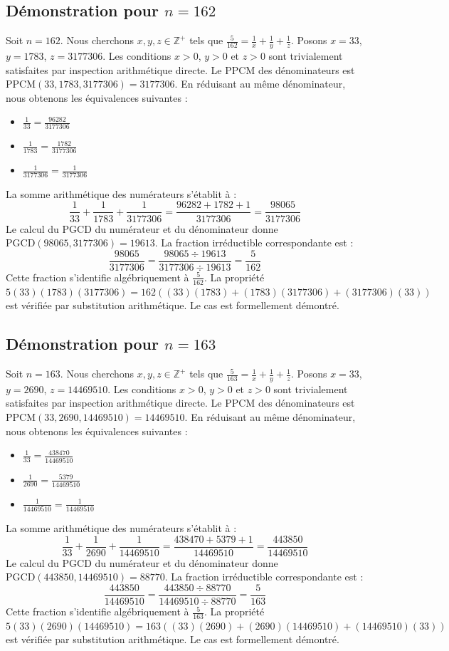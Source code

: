 \documentclass[12pt,a4paper]{article}
\begin{document}
\subsection{Démonstration pour $n = 162$}
Soit $n = 162$. Nous cherchons $x, y, z \in \mathbb{Z}^{+}$ tels que $\frac{5}{162} = \frac{1}{x} + \frac{1}{y} + \frac{1}{z}$.
Posons $x = 33$, $y = 1783$, $z = 3177306$.
Les conditions $x > 0$, $y > 0$ et $z > 0$ sont trivialement satisfaites par inspection arithmétique directe.
Le PPCM des dénominateurs est $\text{PPCM}(33, 1783, 3177306) = 3177306$.
En réduisant au même dénominateur, nous obtenons les équivalences suivantes :
\begin{itemize}
    \item $\frac{1}{33} = \frac{96282}{3177306}$
    \item $\frac{1}{1783} = \frac{1782}{3177306}$
    \item $\frac{1}{3177306} = \frac{1}{3177306}$
\end{itemize}
La somme arithmétique des numérateurs s'établit à :
$$ \frac{1}{33} + \frac{1}{1783} + \frac{1}{3177306} = \frac{96282 + 1782 + 1}{3177306} = \frac{98065}{3177306} $$
Le calcul du PGCD du numérateur et du dénominateur donne $\text{PGCD}(98065, 3177306) = 19613$.
La fraction irréductible correspondante est :
$$ \frac{98065}{3177306} = \frac{98065 \div 19613}{3177306 \div 19613} = \frac{5}{162} $$
Cette fraction s'identifie algébriquement à $\frac{5}{162}$.
La propriété $5(33)(1783)(3177306) = 162((33)(1783) + (1783)(3177306) + (3177306)(33))$ est vérifiée par substitution arithmétique.
Le cas est formellement démontré.

\subsection{Démonstration pour $n = 163$}
Soit $n = 163$. Nous cherchons $x, y, z \in \mathbb{Z}^{+}$ tels que $\frac{5}{163} = \frac{1}{x} + \frac{1}{y} + \frac{1}{z}$.
Posons $x = 33$, $y = 2690$, $z = 14469510$.
Les conditions $x > 0$, $y > 0$ et $z > 0$ sont trivialement satisfaites par inspection arithmétique directe.
Le PPCM des dénominateurs est $\text{PPCM}(33, 2690, 14469510) = 14469510$.
En réduisant au même dénominateur, nous obtenons les équivalences suivantes :
\begin{itemize}
    \item $\frac{1}{33} = \frac{438470}{14469510}$
    \item $\frac{1}{2690} = \frac{5379}{14469510}$
    \item $\frac{1}{14469510} = \frac{1}{14469510}$
\end{itemize}
La somme arithmétique des numérateurs s'établit à :
$$ \frac{1}{33} + \frac{1}{2690} + \frac{1}{14469510} = \frac{438470 + 5379 + 1}{14469510} = \frac{443850}{14469510} $$
Le calcul du PGCD du numérateur et du dénominateur donne $\text{PGCD}(443850, 14469510) = 88770$.
La fraction irréductible correspondante est :
$$ \frac{443850}{14469510} = \frac{443850 \div 88770}{14469510 \div 88770} = \frac{5}{163} $$
Cette fraction s'identifie algébriquement à $\frac{5}{163}$.
La propriété $5(33)(2690)(14469510) = 163((33)(2690) + (2690)(14469510) + (14469510)(33))$ est vérifiée par substitution arithmétique.
Le cas est formellement démontré.
\end{document}
